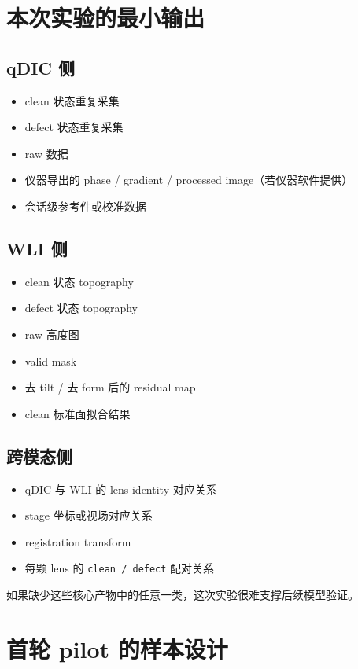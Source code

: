 \documentclass[UTF8,a4paper,11pt]{ctexart}
\newcommand{\Code}[1]{\texttt{#1}}
\begin{document}
\section{本次实验的最小输出}

\subsection{qDIC 侧}
\begin{itemize}
  \item clean 状态重复采集
  \item defect 状态重复采集
  \item raw 数据
  \item 仪器导出的 phase / gradient / processed image（若仪器软件提供）
  \item 会话级参考件或校准数据
\end{itemize}

\subsection{WLI 侧}
\begin{itemize}
  \item clean 状态 topography
  \item defect 状态 topography
  \item raw 高度图
  \item valid mask
  \item 去 tilt / 去 form 后的 residual map
  \item clean 标准面拟合结果
\end{itemize}

\subsection{跨模态侧}
\begin{itemize}
  \item qDIC 与 WLI 的 lens identity 对应关系
  \item stage 坐标或视场对应关系
  \item registration transform
  \item 每颗 lens 的 \Code{clean / defect} 配对关系
\end{itemize}

如果缺少这些核心产物中的任意一类，这次实验很难支撑后续模型验证。

\section{首轮 pilot 的样本设计}
\end{document}

